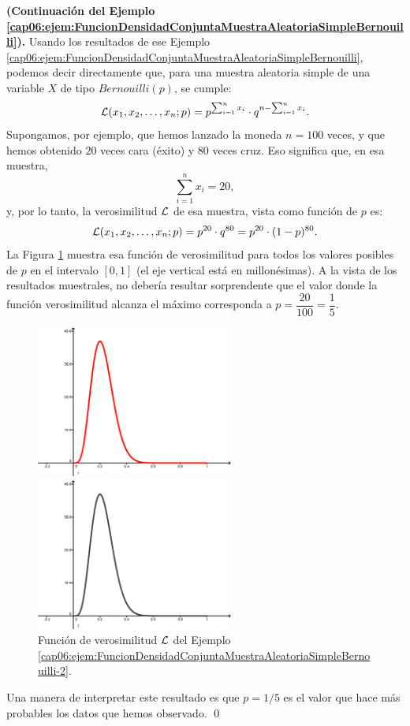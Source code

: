 \begin{ejemplo}{\bf (Continuación del Ejemplo \ref{cap06:ejem:FuncionDensidadConjuntaMuestraAleatoriaSimpleBernouilli}).}
Usando los resultados de ese Ejemplo \ref{cap06:ejem:FuncionDensidadConjuntaMuestraAleatoriaSimpleBernouilli}, podemos decir directamente que, para una muestra aleatoria simple de una variable $X$ de tipo $Bernouilli(p)$, se cumple:
\[
{\cal L}(x_1,x_2,\ldots,x_n;p)=
p^{\sum_{i=1}^n x_i}\cdot q^{n-\sum_{i=1}^n x_i}.
\]
Supongamos, por ejemplo, que hemos lanzado la moneda $n=100$ veces, y que hemos obtenido $20$ veces cara  (éxito) y $80$ veces cruz. Eso significa que, en esa muestra,
\[\sum_{i=1}^n x_i = 20,
\]
y, por lo tanto, la verosimilitud $\cal L$ de esa muestra, vista como función de $p$ es:
\[
{\cal L}(x_1,x_2,\ldots,x_n;p) = p^{20}\cdot q^{80} = p^{20}\cdot (1-p)^{80}.
\]
La Figura \ref{cap06:fig:FuncionVerosimilitudEjemploBernouilli} muestra esa función de verosimilitud para todos los valores posibles de $p$ en el intervalo $[0,1]$ (el eje vertical está en millonésimas). A la vista de los resultados muestrales, no debería resultar sorprendente que el valor donde la función verosimilitud alcanza el máximo corresponda a $p=\dfrac{20}{100}=\dfrac{1}{5}$.
\begin{figure}[h!]
\begin{center}
\begin{enColor}
\includegraphics[height=5cm]{../fig/Cap06-FuncionVerosimilitudEjemploBernouilli.png}
\end{enColor}
\begin{bn}
\includegraphics[height=5cm]{../fig/Cap06-FuncionVerosimilitudEjemploBernouilli-bn.png}
\end{bn}
\caption{Función de verosimilitud $\cal L$ del Ejemplo \ref{cap06:ejem:FuncionDensidadConjuntaMuestraAleatoriaSimpleBernouilli-2}.}
\label{cap06:fig:FuncionVerosimilitudEjemploBernouilli}
\end{center}
\end{figure}
Una manera de interpretar este resultado es que $p=1/5$ es el valor que hace más probables los datos que hemos observado.
\qed
\end{ejemplo}
